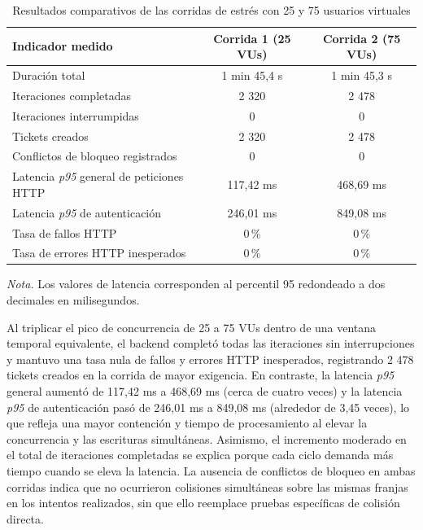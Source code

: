 \begin{table}[htbp]
\centering
\caption{Resultados comparativos de las corridas de estrés con 25 y 75 usuarios virtuales}
\label{tab:resultados-k6}
\begin{tabularx}{\textwidth}{>{\raggedright\arraybackslash}p{5.2cm} cc}
\toprule
\textbf{Indicador medido} & \textbf{Corrida 1 (25 VUs)} & \textbf{Corrida 2 (75 VUs)} \\
\midrule
Duración total & 1 min 45,4 s & 1 min 45,3 s \\
Iteraciones completadas & 2 320 & 2 478 \\
Iteraciones interrumpidas & 0 & 0 \\
Tickets creados & 2 320 & 2 478 \\
Conflictos de bloqueo registrados & 0 & 0 \\
Latencia \textit{p95} general de peticiones HTTP & 117,42 ms & 468,69 ms \\
Latencia \textit{p95} de autenticación & 246,01 ms & 849,08 ms \\
Tasa de fallos HTTP & 0\,\% & 0\,\% \\
Tasa de errores HTTP inesperados & 0\,\% & 0\,\% \\
\bottomrule
\end{tabularx}
\par\vspace{0.3em}
\raggedright\footnotesize{\textit{Nota.} Los valores de latencia corresponden al percentil 95 redondeado a dos decimales en milisegundos.}
\end{table}

Al triplicar el pico de concurrencia de 25 a 75 VUs dentro de una ventana temporal equivalente, el backend completó todas las iteraciones sin interrupciones y mantuvo una tasa nula de fallos y errores HTTP inesperados, registrando 2 478 tickets creados en la corrida de mayor exigencia. En contraste, la latencia \textit{p95} general aumentó de 117,42 ms a 468,69 ms (cerca de cuatro veces) y la latencia \textit{p95} de autenticación pasó de 246,01 ms a 849,08 ms (alrededor de 3,45 veces), lo que refleja una mayor contención y tiempo de procesamiento al elevar la concurrencia y las escrituras simultáneas. Asimismo, el incremento moderado en el total de iteraciones completadas se explica porque cada ciclo demanda más tiempo cuando se eleva la latencia. La ausencia de conflictos de bloqueo en ambas corridas indica que no ocurrieron colisiones simultáneas sobre las mismas franjas en los intentos realizados, sin que ello reemplace pruebas específicas de colisión directa.

